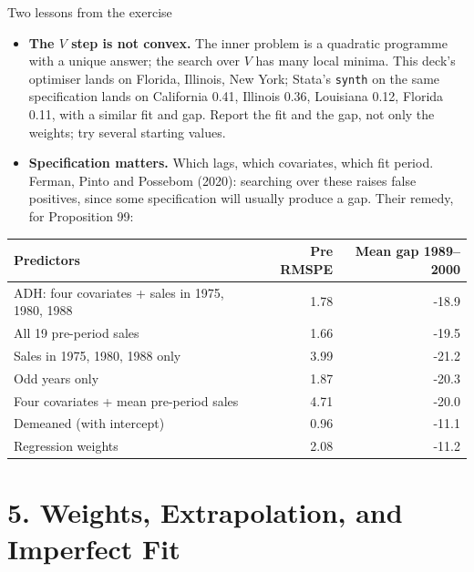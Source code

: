 \documentclass[
  11pt,
  ignorenonframetext,
  aspectratio=169,
]{beamer}
\providecommand{\tightlist}{%
  \setlength{\itemsep}{0pt}\setlength{\parskip}{0pt}}
\begin{document}
\begin{frame}[fragile]{Two lessons from the exercise}
\protect{}\label{two-lessons-from-the-exercise}
\begin{itemize}
\tightlist
\item
  \textbf{The \(V\) step is not convex.} The inner problem is a
  quadratic programme with a unique answer; the search over \(V\) has
  many local minima. This deck's optimiser lands on Florida, Illinois,
  New York; Stata's \texttt{synth} on the same specification lands on
  California 0.41, Illinois 0.36, Louisiana 0.12, Florida 0.11, with a
  similar fit and gap. Report the fit and the gap, not only the weights;
  try several starting values.
\item
  \textbf{Specification matters.} Which lags, which covariates, which
  fit period. Ferman, Pinto and Possebom (2020): searching over these
  raises false positives, since some specification will usually produce
  a gap. Their remedy, for Proposition 99:
\end{itemize}

\begin{center}\scriptsize
\begin{tabular}{lrr}
\toprule
Predictors & Pre RMSPE & Mean gap 1989--2000 \\
\midrule
ADH: four covariates + sales in 1975, 1980, 1988  &  1.78  &  -18.9  \\
All 19 pre-period sales  &  1.66  &  -19.5  \\
Sales in 1975, 1980, 1988 only  &  3.99  &  -21.2  \\
Odd years only  &  1.87  &  -20.3  \\
Four covariates + mean pre-period sales  &  4.71  &  -20.0  \\
Demeaned (with intercept)  &  0.96  &  -11.1  \\
Regression weights  &  2.08  &  -11.2  \\
\bottomrule
\end{tabular}
\end{center}
\end{frame}

\section{5. Weights, Extrapolation, and Imperfect
Fit}\label{weights-extrapolation-and-imperfect-fit}
\end{document}
